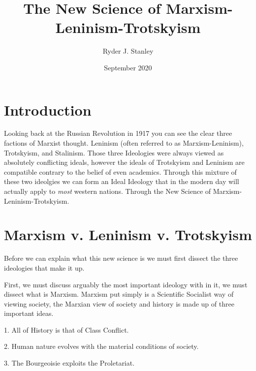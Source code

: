 \documentclass{article}
\title{The New Science of Marxism-Leninism-Trotskyism}
\author{Ryder J. Stanley}
\date{September 2020}
\begin{document}
  \maketitle
\section{Introduction}

\par
   Looking back at the Russian Revolution in 1917 you can see the clear three factions of Marxist thought. Leninism (often referred to as Marxism-Leninism), Trotskyism, and Stalinism. Those three Ideologies were always viewed as absolutely conflicting ideals, however the ideals of Trotskyism and Leninism are compatible contrary to the belief of even academics. Through this mixture of these two ideolgies we can form an Ideal Ideology that in the modern day will actually apply to \emph{most} western nations. Through the New Science of Marxism-Leninism-Trotskyism. \par 
   
\section{Marxism v. Leninism v. Trotskyism}
	
	Before we can explain what this new science is we must first dissect the three ideologies that make it up. \par
	First, we must discuss arguably the most important ideology with in it, we must dissect what is Marxism. Marxism put simply is a Scientific Socialist way of viewing society, the Marxian view of society and history is made up of three important ideas. \par
	1. All of History is that of Class Conflict. \par
	2. Human nature evolves with the material conditions of society. \par
	3. The Bourgeoisie exploits the Proletariat. \par 
	
	
\end{document}
